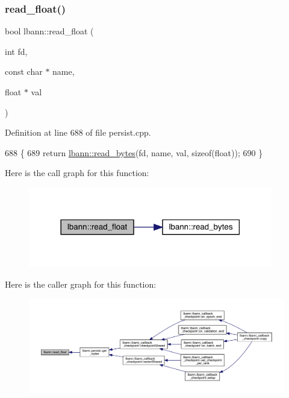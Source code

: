 \subsubsection{\texorpdfstring{read\+\_\+float()}{read\_float()}}
{\footnotesize\ttfamily bool lbann\+::read\+\_\+float (\begin{DoxyParamCaption}\item[{int}]{fd,  }\item[{const char $\ast$}]{name,  }\item[{float $\ast$}]{val }\end{DoxyParamCaption})}



Definition at line 688 of file persist.\+cpp.


\begin{DoxyCode}
688                                                            \{
689   \textcolor{keywordflow}{return} \hyperlink{namespacelbann_a85385e2a9e058b6720300b4cbdd2b1d0}{lbann::read\_bytes}(fd, name, val, \textcolor{keyword}{sizeof}(\textcolor{keywordtype}{float}));
690 \}
\end{DoxyCode}
Here is the call graph for this function\+:\nopagebreak
\begin{figure}[H]
\begin{center}
\leavevmode
\includegraphics[width=302pt]{namespacelbann_acd0595f8c31773a3a46f477a83e4c0f3_cgraph}
\end{center}
\end{figure}
Here is the caller graph for this function\+:\nopagebreak
\begin{figure}[H]
\begin{center}
\leavevmode
\includegraphics[width=350pt]{namespacelbann_acd0595f8c31773a3a46f477a83e4c0f3_icgraph}
\end{center}
\end{figure}
\mbox{\label{namespacelbann_acb5b0f1b30c9ab2fba700bb953515810}} 
